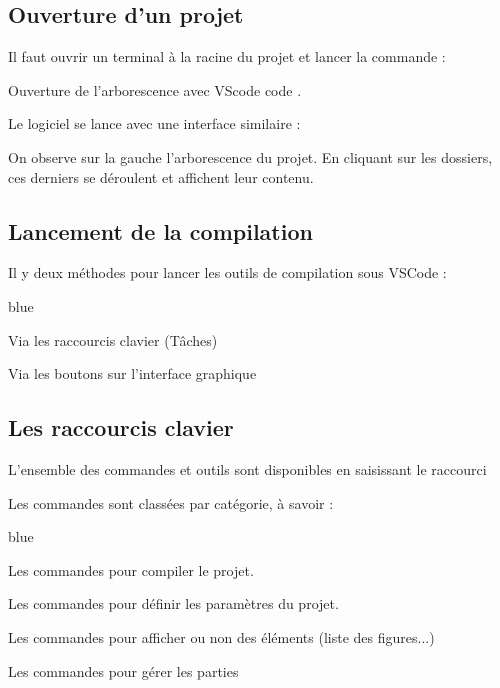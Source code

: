 \subsection{Ouverture d'un projet}

Il faut ouvrir un terminal à la racine du projet et lancer la commande : 

\begin{Bash}{Ouverture de l'arborescence avec VScode}
code .
\end{Bash}


Le logiciel se lance avec une interface similaire :


On observe sur la gauche l'arborescence du projet. En cliquant sur les dossiers, ces derniers se déroulent et affichent leur contenu.


    
\subsection{Lancement de la compilation}

Il y deux méthodes pour lancer les outils de compilation sous VSCode :

\begin{items}{blue}{\Bullet}
    \item Via les raccourcis clavier (Tâches)
    \item Via les boutons sur l'interface graphique
\end{items}

\subsection{Les raccourcis clavier}

\label{allTasks}
L'ensemble des commandes et outils sont disponibles en saisissant le raccourci  


Les commandes sont classées par catégorie, à savoir : 

\begin{items}{blue}{\Triangle}

    \item {}

    Les commandes pour compiler le projet. 
    \item {}

    Les commandes pour définir les paramètres du projet.
    \item {}

    Les commandes pour afficher ou non des éléments (liste des figures...)
    \item {}

    Les commandes pour gérer les parties
\end{items}

